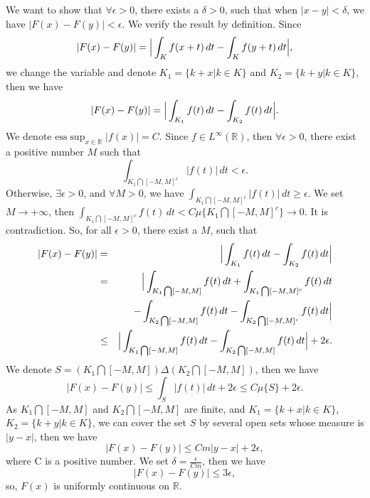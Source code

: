 \documentclass[12pt,a4paper]{ctexart}
\begin{document}
We want to show that $\forall \epsilon > 0$, there exists a $\delta > 0$, such that when $|x - y| < \delta$, we have $|F(x) - F(y)| < \epsilon$. We verify the result by definition. Since
\begin{equation*}
   |F(x) - F(y)|  =  \Big{|} \int_{K}^{} f(x + t) \, d t - \int_{K}^{} f(y + t) \, d t \Big{|},
\end{equation*}
we change the variable and denote $K_{1} = \{k + x| k \in K \}$ and $K_{2} = \{ k + y| k \in K \}$, then we have
\begin{equation*}
   |F(x) - F(y)|  =  \Big{|} \int_{K_{1}}^{} f(t) \, d t - \int_{K_{2}}^{} f(t) \, d t \Big{|}.
\end{equation*}
We denote $\text{ess} \sup_{x \in \mathbb{R}} |f(x)| = C$. Since $f \in L^{\infty} (\mathbb{R})$, then $\forall \epsilon > 0$, there exist a positive number $M$ such that
\begin{equation*}
    \int_{K_{1} \bigcap [-M, M]^{c}}^{} |f(t)| \, d t < \epsilon.
\end{equation*}
Otherwise, $\exists \epsilon > 0$, and $\forall M > 0$, we have $\int_{K_{1} \bigcap [-M, M]^{c}}^{} |f(t)| \, d t \geq \epsilon$. We set $M \to + \infty$, then $\int_{K_{1} \bigcap [-M, M]^{c}}^{} f(t) \, d t  < C \mu \{K_{1} \bigcap [-M, M]^{c} \} \to 0$. It is contradiction. So, for all $\epsilon > 0$, there exist a $M$, such that
\begin{eqnarray*}
|F(x) - F(y)| & = & \Big{|} \int_{K_{1}}^{} f(t) \, d t - \int_{K_{2}}^{} f(t) \, d t \Big{|} \\
& = & \Big{|} \int_{K_{1} \bigcap [-M, M]}^{} f(t) \, d t  + \int_{K_{1} \bigcap [-M, M]^{c}}^{} f(t) \, d t  \\
& & - \int_{K_{2} \bigcap [-M, M]}^{} f(t) \, d t - \int_{K_{2} \bigcap [-M, M]^{c}}^{} f(t) \, d t \Big{|}   \\
&\leq&  \Big{|} \int_{K_{1} \bigcap [-M, M]}^{} f(t) \, d t - \int_{K_{2} \bigcap [-M, M]}^{} f(t) \, d t \Big{|} + 2 \epsilon.
\end{eqnarray*}
We denote $S = (K_{1} \bigcap [-M, M]) \Delta (K_{2} \bigcap [-M, M])$, then we have
\begin{equation*}
    |F(x) - F(y)|  \leq  \int_{S}^{} |f(t)| \, d t + 2 \epsilon \leq C \mu \{S \} + 2 \epsilon.
\end{equation*}
As $K_{1} \bigcap [-M, M]$ and $K_{2} \bigcap [-M, M]$ are finite, and $K_{1} = \{k + x| k \in K \}$, $K_{2} = \{ k + y| k \in K \}$, we can cover the set $S$ by several open sets whose measure is $|y -x|$, then we have
\begin{equation*}
    |F(x) - F(y)| \leq C m |y - x| + 2 \epsilon,
\end{equation*}
where C is a positive number. We set $\delta = \frac{\epsilon}{Cm}$, then we have
\begin{equation*}
    |F(x) - F(y)| \leq  3 \epsilon,
\end{equation*}
so, $F(x)$ is uniformly continuous on $\mathbb{R}$.
\end{document}
